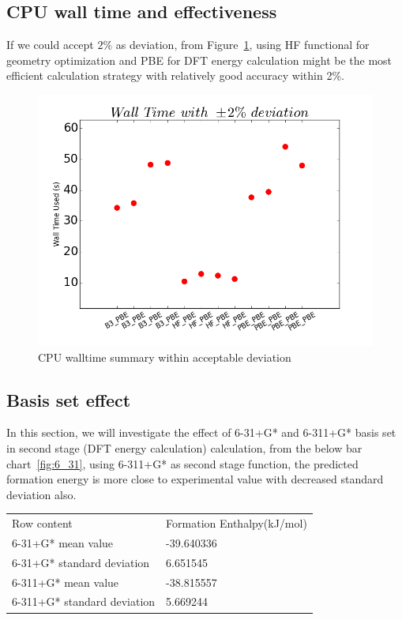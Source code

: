 \documentclass{article}
\begin{document}
\subsection{CPU wall time and effectiveness}
If we could accept $2\%$ as deviation, from Figure~\ref{fig:walltime}, using HF functional for geometry optimization and PBE for DFT energy calculation might be the most efficient calculation strategy with relatively good accuracy within 2\%. 
\begin{figure}[ht]
\includegraphics[width=1\textwidth]{walltime.png}
\caption{CPU walltime summary within acceptable deviation}
\label{fig:walltime}
\end{figure}

\subsection{Basis set effect}
In this section, we will investigate the effect of 6-31+G* and 6-311+G* basis set in second stage (DFT energy calculation) calculation, from the below bar chart~\ref{fig:6_31}, using 6-311+G* as second stage function, the predicted formation energy is more close to experimental value with decreased standard deviation also. 

\begin{tabular}{ll}
Row content & Formation Enthalpy(kJ/mol) \\
6-31+G* mean value & -39.640336 \\
6-31+G* standard deviation & 6.651545 \\ 
6-311+G* mean value & -38.815557\\
6-311+G* standard deviation & 5.669244 \\ 
\end{tabular}
\end{document}
